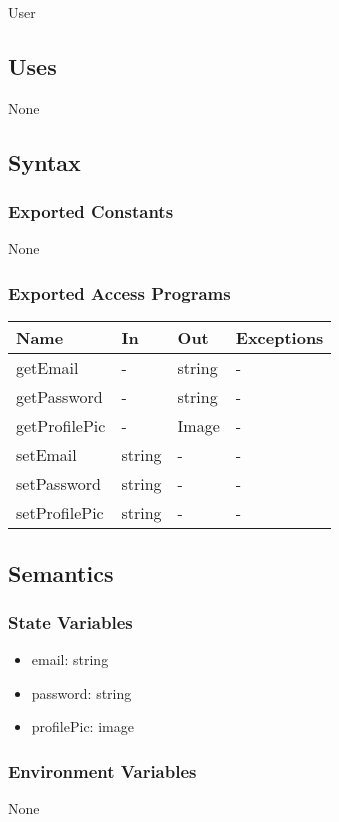 \documentclass[12pt, titlepage]{article}
\begin{document}
User

\subsection{Uses}
None

\subsection{Syntax}

\subsubsection{Exported Constants}
None
\subsubsection{Exported Access Programs}

\begin{center}
\begin{tabular}{p{2cm} p{4cm} p{4cm} p{2cm}}
\hline
\textbf{Name} & \textbf{In} & \textbf{Out} & \textbf{Exceptions} \\
\hline
getEmail & - & string & - \\
getPassword & - & string & - \\
getProfilePic & - & Image & - \\
setEmail & string & - & - \\
setPassword & string & - & - \\
setProfilePic & string & - & - \\
\hline
\end{tabular}
\end{center}

\subsection{Semantics}

\subsubsection{State Variables}
\begin{itemize}
    \item email: string
    \item password: string
    \item profilePic: image
\end{itemize}
\subsubsection{Environment Variables}
None
\end{document}

